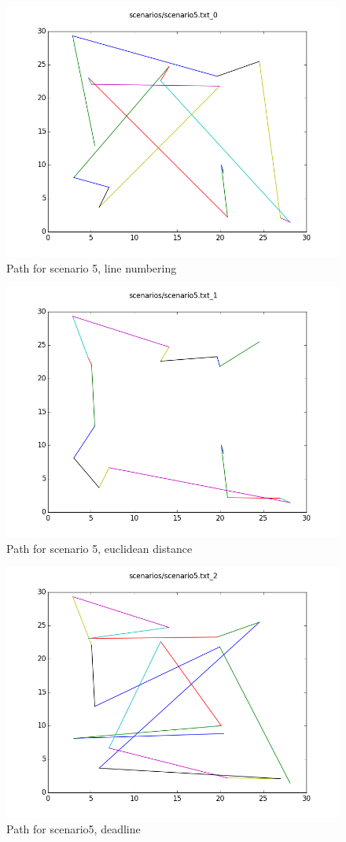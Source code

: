 \documentclass[paper=a4, fontsize=11pt]{scrartcl} %
\numberwithin{equation}{section} %
\numberwithin{figure}{section} %
\numberwithin{table}{section} %
\begin{document}
\begin{figure}[H]
	\centering
  	\includegraphics[width=1\textwidth]{results/5_0.png}
	\caption{Path for scenario 5, line numbering}
\end{figure}
\begin{figure}[H]
	\centering
  \includegraphics[width=1\textwidth]{results/5_1.png}
	\caption{Path for scenario 5, euclidean distance}
\end{figure}
\begin{figure}[H]
	\centering
  \includegraphics[width=1\textwidth]{results/5_2.png}
	\caption{Path for scenario5, deadline}
\end{figure}
\end{document}
